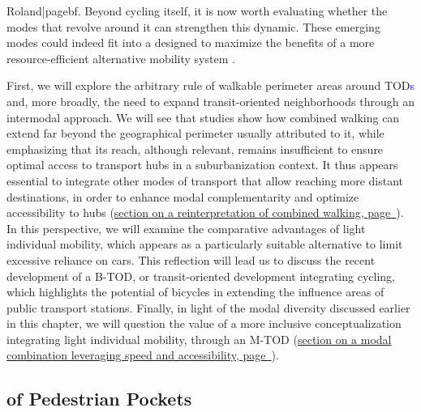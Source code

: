 \begin{refsegment}
{Roland|pagebf}. Beyond cycling itself, it is now worth evaluating whether the  modes that revolve around it can strengthen this dynamic. These emerging modes could indeed fit into a  designed to maximize the benefits of a more resource-efficient alternative mobility system \textcolor{blue}{\autocite[134]{litman_new_2021}}.%

First, we will explore the arbitrary rule of walkable perimeter areas around \acrshort{TOD}\textcolor{blue}{s} and, more broadly, the need to expand transit-oriented neighborhoods through an intermodal approach. We will see that studies show how combined walking can extend far beyond the geographical perimeter usually attributed to it, while emphasizing that its reach, although relevant, remains insufficient to ensure optimal access to transport hubs in a suburbanization context. It thus appears essential to integrate other modes of transport that allow reaching more distant destinations, in order to enhance modal complementarity and optimize accessibility to hubs (\hyperref[chap1:btod-limites-tod]{section on a reinterpretation of combined walking, page~\pageref{chap1:btod-limites-tod}}). In this perspective, we will examine the comparative advantages of light individual mobility, which appears as a particularly suitable alternative to limit excessive reliance on cars. This reflection will lead us to discuss the recent development of a \acrfull{B-TOD}, or transit-oriented development integrating cycling, which highlights the potential of bicycles in extending the influence areas of public transport stations. Finally, in light of the modal diversity discussed earlier in this chapter, we will question the value of a more inclusive conceptualization integrating light individual mobility, through an \acrfull{M-TOD} (\hyperref[chap1:btod-definition]{section on a modal combination leveraging speed and  accessibility, page~\pageref{chap1:btod-definition}}).%

\subsection{ of Pedestrian Pockets
    \label{chap1:btod-limites-tod}
    }


\end{refsegment}
